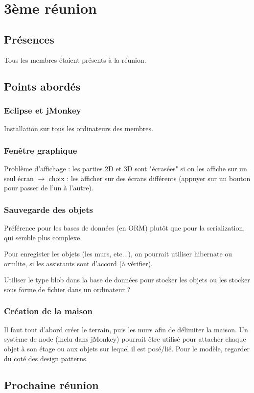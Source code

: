 \documentclass[12pt,a4paper]{article}
\begin{document}
\section{3ème réunion}
	\subsection{Présences}
		Tous les membres étaient présents à la réunion.
	\subsection{Points abordés}
		\subsubsection{Eclipse et jMonkey}
			Installation sur tous les ordinateurs des membres.
		\subsubsection{Fenêtre graphique}
			Problème d'affichage : les parties 2D et 3D sont "écrasées" si on les affiche sur un seul écran $\rightarrow$ choix : les afficher sur des écrans différents (appuyer sur un bouton pour passer de l'un à l'autre).
		\subsubsection{Sauvegarde des objets}
			Préférence pour les bases de données (en ORM) plutôt que pour la serialization, qui semble plus complexe.			
			
			Pour enregister les objets (les murs, etc...), on pourrait utiliser hibernate ou ormlite, si les assistants sont d'accord (à vérifier).
			
			Utiliser le type blob dans la base de données pour stocker les objets ou les stocker sous forme de fichier dans un ordinateur ?
		\subsubsection{Création de la maison}
			Il faut tout d'abord créer le terrain, puis les murs afin de délimiter la maison. Un système de node (inclu dans jMonkey) pourrait être utilisé pour attacher chaque objet à son étage ou aux objets sur lequel il est posé/lié. Pour le modèle, regarder du coté des design patterns.
			
	\subsection{Prochaine réunion}
\end{document}
